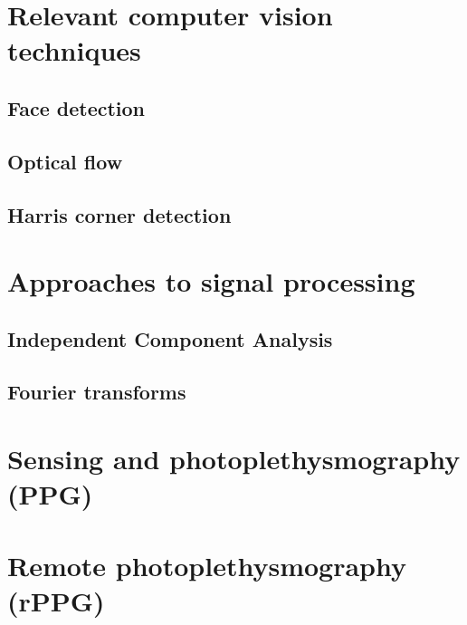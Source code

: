 
\section{Relevant computer vision techniques}
\subsection{Face detection}
\subsection{Optical flow}
\subsection{Harris corner detection}
\section{Approaches to signal processing}
\subsection{Independent Component Analysis}
\subsection{Fourier transforms}

\section{Sensing and photoplethysmography (PPG)}
\section{Remote photoplethysmography (rPPG)}

